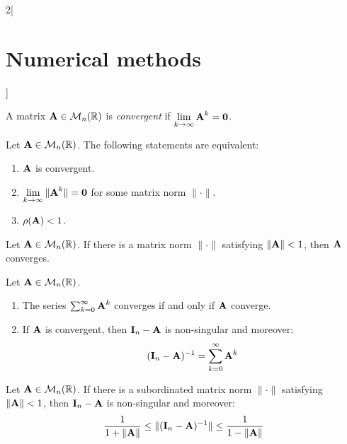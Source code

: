 \documentclass[../../../main.tex]{subfiles}
\begin{document}
\begin{multicols}{2}[\section{Numerical methods}]
\begin{prop}
  \end{prop}
  \begin{definition}
    A matrix $\boldsymbol{\mathrm{A}}\in\mathcal{M}_n(\mathbb{R})$ is \textit{convergent} if $\displaystyle\lim_{k\to\infty}\boldsymbol{\mathrm{A}}^k=\boldsymbol{\mathrm{0}}$.
  \end{definition}
  \begin{theorem}
    Let $\boldsymbol{\mathrm{A}}\in\mathcal{M}_n(\mathbb{R})$. The following statements are equivalent:
    \begin{enumerate}
      \item $\boldsymbol{\mathrm{A}}$ is convergent.
      \item $\displaystyle\lim_{k\to\infty}\|\boldsymbol{\mathrm{A}}^k\|=\boldsymbol{\mathrm{0}}$ for some matrix norm $\|\cdot\|$.
      \item $\rho(\boldsymbol{\mathrm{A}})<1$.
    \end{enumerate}
  \end{theorem}
  \begin{corollary}
    Let $\boldsymbol{\mathrm{A}}\in\mathcal{M}_n(\mathbb{R})$. If there is a matrix norm $\|\cdot\|$ satisfying $\|\boldsymbol{\mathrm{A}}\|<1$, then $\boldsymbol{\mathrm{A}}$ converges.
  \end{corollary}
  \begin{theorem}
    Let $\boldsymbol{\mathrm{A}}\in\mathcal{M}_n(\mathbb{R})$.
    \begin{enumerate}
      \item The series $\sum_{k=0}^\infty \boldsymbol{\mathrm{A}}^k$ converges if and only if $\boldsymbol{\mathrm{A}}$ converge.
      \item If $\boldsymbol{\mathrm{A}}$ is convergent, then $\boldsymbol{\mathrm{I}}_n-\boldsymbol{\mathrm{A}}$ is non-singular and moreover: $$(\boldsymbol{\mathrm{I}}_n-\boldsymbol{\mathrm{A}})^{-1}=\sum_{k=0}^\infty\boldsymbol{\mathrm{A}}^k$$
    \end{enumerate}
  \end{theorem}
  \begin{corollary}
    Let $\boldsymbol{\mathrm{A}}\in\mathcal{M}_n(\mathbb{R})$. If there is a subordinated matrix norm $\|\cdot\|$ satisfying $\|\boldsymbol{\mathrm{A}}\|<1$, then $\boldsymbol{\mathrm{I}}_n-\boldsymbol{\mathrm{A}}$ is non-singular and moreover: $$\frac{1}{1+\|\boldsymbol{\mathrm{A}}\|}\leq\|(\boldsymbol{\mathrm{I}}_n-\boldsymbol{\mathrm{A}})^{-1}\|\leq\frac{1}{1-\|\boldsymbol{\mathrm{A}}\|}$$
  \end{corollary}

\end{multicols}
\end{document}
